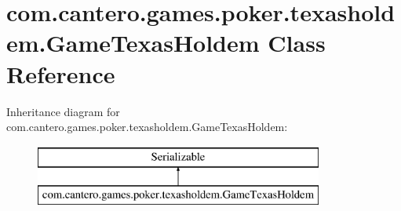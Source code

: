 \hypertarget{classcom_1_1cantero_1_1games_1_1poker_1_1texasholdem_1_1_game_texas_holdem}{}\section{com.\+cantero.\+games.\+poker.\+texasholdem.\+Game\+Texas\+Holdem Class Reference}
\label{classcom_1_1cantero_1_1games_1_1poker_1_1texasholdem_1_1_game_texas_holdem}
Inheritance diagram for com.\+cantero.\+games.\+poker.\+texasholdem.\+Game\+Texas\+Holdem\+:\begin{figure}[H]
\begin{center}
\leavevmode
\includegraphics[height=2.000000cm]{classcom_1_1cantero_1_1games_1_1poker_1_1texasholdem_1_1_game_texas_holdem}
\end{center}
\end{figure}
